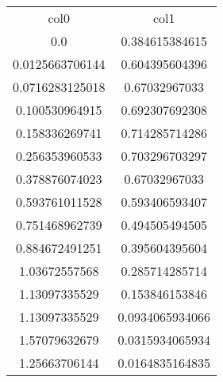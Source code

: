 \begin{table}
\begin{tabular}{cc}
col0 & col1 \\
0.0 & 0.384615384615 \\
0.0125663706144 & 0.604395604396 \\
0.0716283125018 & 0.67032967033 \\
0.100530964915 & 0.692307692308 \\
0.158336269741 & 0.714285714286 \\
0.256353960533 & 0.703296703297 \\
0.378876074023 & 0.67032967033 \\
0.593761011528 & 0.593406593407 \\
0.751468962739 & 0.494505494505 \\
0.884672491251 & 0.395604395604 \\
1.03672557568 & 0.285714285714 \\
1.13097335529 & 0.153846153846 \\
1.13097335529 & 0.0934065934066 \\
1.57079632679 & 0.0315934065934 \\
1.25663706144 & 0.0164835164835 \\
\end{tabular}
\end{table}
